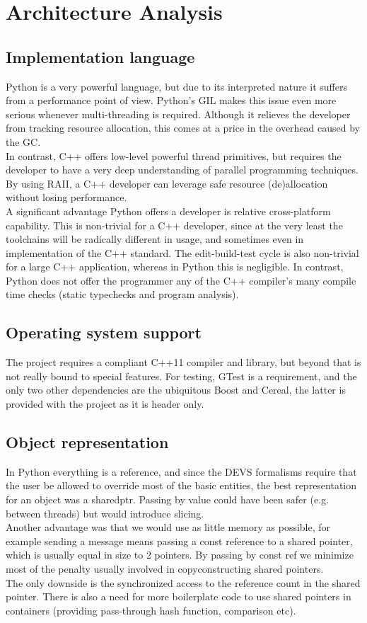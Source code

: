 \documentclass[8pt,a4paper]{report}
\begin{document}
\chapter{Architecture Analysis}
\section{Implementation language}
Python is a very powerful language, but due to its interpreted nature it suffers from a performance point of view. Python's GIL \cite{gil} makes this issue even more serious whenever multi-threading is required. Although it relieves the developer from tracking resource allocation, this comes at a price in the overhead caused by the GC. \\
In contrast, C++ offers low-level powerful thread primitives, but requires the developer to have a very deep understanding of parallel programming techniques. By using RAII, a C++ developer can leverage safe resource (de)allocation without losing performance.\\
A significant advantage Python offers a developer is relative cross-platform capability. This is non-trivial for a C++ developer, since at the very least the toolchains will be radically different in usage, and sometimes even in implementation of the C++ standard. The edit-build-test cycle is also non-trivial for a large C++ application, whereas in Python this is negligible. In contrast, Python does not offer the programmer any of the C++ compiler's many compile time checks (static typechecks and program analysis).

\section{Operating system support}
The project requires a compliant C++11 compiler and library, but beyond that is not really bound to special features. For testing, GTest is a requirement, and the only two other dependencies are the ubiquitous Boost and Cereal, the latter is provided with the project as it is header only.

\section{Object representation}
In Python everything is a reference, and since the DEVS formalisms require that the user be allowed to override most of the basic entities, the best representation for an object was a shared\textunderscore ptr. Passing by value could have been safer (e.g. between threads) but would introduce slicing.\\ Another advantage was that we would use as little memory as possible, for example sending a message means passing a const reference to a shared pointer, which is usually equal in size to 2 pointers. By passing by const ref we minimize most of the penalty usually involved in copyconstructing shared pointers. \\
The only downside is the synchronized access to the reference count in the shared pointer. There is also a need for more boilerplate code to use shared pointers in containers (providing pass-through hash function, comparison etc). 
\end{document}
